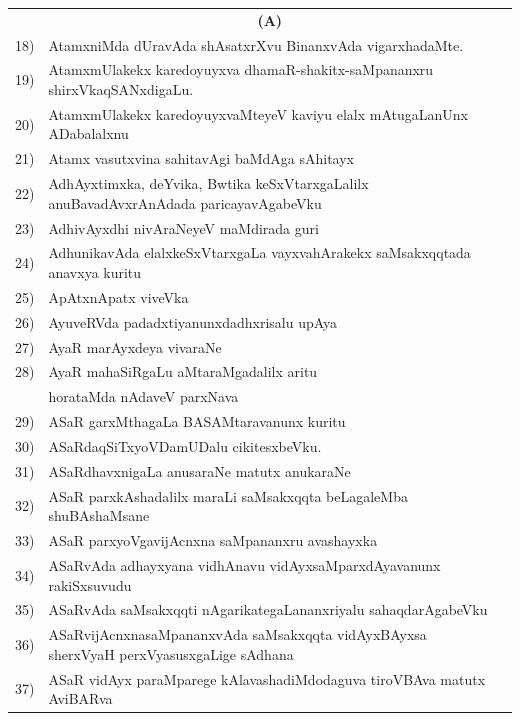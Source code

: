 {\begin{longtable}{@{}cp{7.4cm}r}
    &   \multicolumn{1}{c}{\textbf{(A)}} & \\    
18) & AtamxniMda dUravAda shAsatxrXvu BinanxvAda vigarxhadaMte. &   \pageref{page188}\\
19) & AtamxmUlakekx karedoyuyxva dhamaR-shakitx-saMpananxru shirxVkaqSANxdigaLu. &   \pageref{page237}\\
20) & AtamxmUlakekx karedoyuyxvaMteyeV kaviyu elalx mAtugaLanUnx ADabalalxnu &   \pageref{page237}\\
21) & Atamx vasutxvina sahitavAgi baMdAga sAhitayx & \pageref{page196}\\
22) & AdhAyxtimxka, deYvika, Bwtika keSxVtarxgaLalilx anuBavadAvxrAnAdada paricayavAgabeVku & \pageref{page127}\\
23) & AdhivAyxdhi nivAraNeyeV maMdirada guri & \pageref{page67}\\
24) &  AdhunikavAda elalxkeSxVtarxgaLa vayxvahArakekx saMsakxqqtada anavxya kuritu & \pageref{page36}\\
25) & ApAtxnApatx viveVka & \pageref{page173}\\
26) & AyuveRVda padadxtiyanunxdadhxrisalu upAya & \pageref{page51}\\
27) & AyaR marAyxdeya vivaraNe & \pageref{page90}\\
28) & AyaR mahaSiRgaLu aMtaraMgadalilx aritu &   \\
    & horataMda nAdaveV parxNava   & \pageref{page138}\\
29) & ASaR garxMthagaLa BASAMtaravanunx kuritu  & \pageref{page32}\\
30) & ASaRdaqSiTxyoVDamUDalu cikitesxbeVku. & \pageref{page61}\\
31) & ASaRdhavxnigaLa anusaraNe matutx anukaraNe & \pageref{page120}\\
32) & ASaR parxkAshadalilx maraLi saMsakxqqta beLagaleMba shuBAshaMsane & \pageref{page62}\\
33) & ASaR parxyoVgavijAcnxna saMpananxru avashayxka & \pageref{page54}\\
34) & ASaRvAda adhayxyana vidhAnavu vidAyxsaMparxdAyavanunx rakiSxsuvudu & \pageref{page48}\\
35) & ASaRvAda saMsakxqqti nAgarikategaLananxriyalu sahaqdarAgabeVku & \pageref{page51}\\
36) & ASaRvijAcnxnasaMpananxvAda saMsakxqqta vidAyxBAyxsa sherxVyaH perxVyasusxgaLige sAdhana & \pageref{page42}\\
37) & ASaR vidAyx paraMparege kAlavashadiMdodaguva tiroVBAva matutx AviBARva & \pageref{page92}\\

\end{longtable}}
